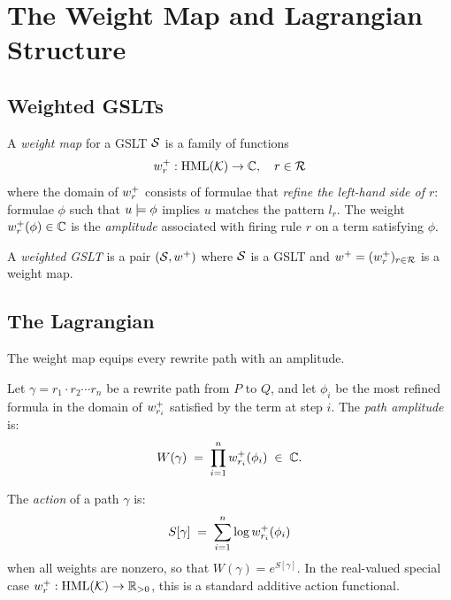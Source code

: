 \chapter{The Weight Map and Lagrangian Structure}
\label{sec:weighted}

\section{Weighted GSLTs}

\begin{definition}
A \emph{weight map} for a GSLT $\mathcal{S}$ is a family of functions
\[
  w^{+}_r : \mathrm{HML}(\mathcal{K}) \to \mathbb{C}, \quad r \in \mathcal{R}
\]
where the domain of $w^{+}_r$ consists of formulae that \emph{refine the
left-hand side of $r$}: formulae $\phi$ such that $u \models \phi$ implies $u$
matches the pattern $l_r$.  The weight $w^{+}_r(\phi) \in \mathbb{C}$ is the
\emph{amplitude} associated with firing rule $r$ on a term satisfying $\phi$.
\end{definition}

\begin{definition}
A \emph{weighted GSLT} is a pair $(\mathcal{S}, w^{+})$ where $\mathcal{S}$ is a GSLT and
$w^{+} = (w^{+}_r)_{r \in \mathcal{R}}$ is a weight map.
\end{definition}

\section{The Lagrangian}

The weight map equips every rewrite path with an amplitude.

\begin{definition}
Let $\gamma = r_1 \cdot r_2 \cdots r_n$ be a rewrite path from $P$ to $Q$,
and let $\phi_i$ be the most refined formula in the domain of $w^{+}_{r_i}$
satisfied by the term at step $i$.  The \emph{path amplitude} is:
\[
  W(\gamma) \;=\; \prod_{i=1}^{n} w^{+}_{r_i}(\phi_i) \;\in\; \mathbb{C}.
\]
\end{definition}

\begin{definition}
The \emph{action} of a path $\gamma$ is:
\[
  S[\gamma] \;=\; \sum_{i=1}^{n} \log w^{+}_{r_i}(\phi_i)
\]
when all weights are nonzero, so that $W(\gamma) = e^{S[\gamma]}$.
In the real-valued special case $w^{+}_r : \mathrm{HML}(\mathcal{K}) \to \mathbb{R}_{>0}$, this
is a standard additive action functional.
\end{definition}

